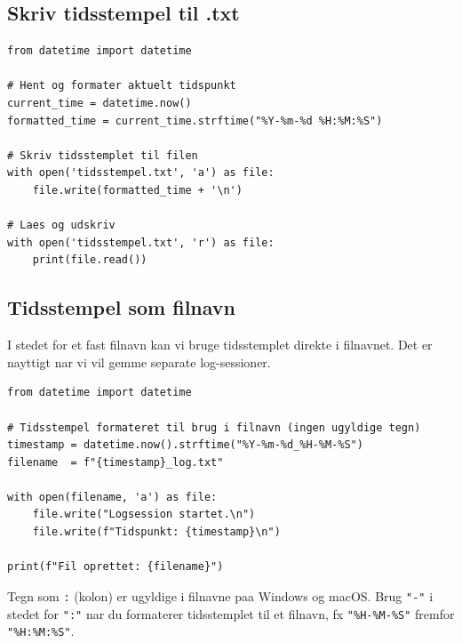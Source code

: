 \documentclass[12pt, a4paper]{article}
\begin{document}
\subsection{Skriv tidsstempel til .txt}

\begin{tcolorbox}[pythonbox, title={\faPython\quad Kode 2 --- Tidsstempel i tekstfil}]
\begin{verbatim}
from datetime import datetime

# Hent og formater aktuelt tidspunkt
current_time = datetime.now()
formatted_time = current_time.strftime("%Y-%m-%d %H:%M:%S")

# Skriv tidsstemplet til filen
with open('tidsstempel.txt', 'a') as file:
    file.write(formatted_time + '\n')

# Laes og udskriv
with open('tidsstempel.txt', 'r') as file:
    print(file.read())
\end{verbatim}
\end{tcolorbox}

\subsection{Tidsstempel som filnavn}

I stedet for et fast filnavn kan vi bruge tidsstemplet direkte i filnavnet.
Det er nayttigt nar vi vil gemme separate log-sessioner.

\begin{tcolorbox}[pythonbox, title={\faPython\quad Kode 3 --- Tidsstempel som filnavn}]
\begin{verbatim}
from datetime import datetime

# Tidsstempel formateret til brug i filnavn (ingen ugyldige tegn)
timestamp = datetime.now().strftime("%Y-%m-%d_%H-%M-%S")
filename  = f"{timestamp}_log.txt"

with open(filename, 'a') as file:
    file.write("Logsession startet.\n")
    file.write(f"Tidspunkt: {timestamp}\n")

print(f"Fil oprettet: {filename}")
\end{verbatim}
\end{tcolorbox}

\begin{tcolorbox}[warnbox, title={\faExclamationTriangle\quad Undgaa ugyldige tegn i filnavne}]
Tegn som \texttt{:} (kolon) er ugyldige i filnavne paa Windows og macOS.
Brug \texttt{"-"} i stedet for \texttt{":"} nar du formaterer tidsstemplet
til et filnavn, fx \texttt{"\%H-\%M-\%S"} fremfor \texttt{"\%H:\%M:\%S"}.
\end{tcolorbox}
\end{document}
